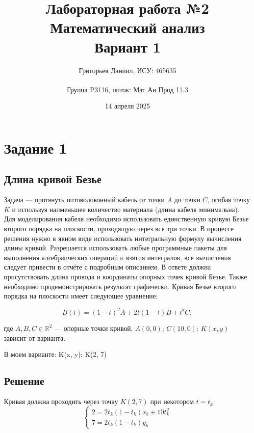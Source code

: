 \documentclass{article}
\title{Лабораторная работа №2\\Математический анализ\\Вариант 1}
\author{Григорьев Даниил, ИСУ: 465635\\\\ Группа P3116, поток: Мат Ан Прод 11.3}
\date{14 апреля 2025}
\begin{document}
\maketitle

\section*{Задание 1}
\subsection*{Длина кривой Безье}
Задача — протянуть оптоволоконный кабель от точки $A$ до точки $C$, огибая точку $K$ и используя наименьшее количество материала (длина кабеля минимальна). Для моделирования кабеля необходимо использовать единственную кривую Безье второго порядка на плоскости, проходящую через все три точки. В процессе решения нужно в явном виде использовать интегральную формулу вычисления длины кривой. Разрешается использовать любые программные пакеты для выполнения алгебраических операций и взятия интегралов, все вычисления следует привести в отчёте с подробным описанием. В ответе должна присутствовать длина провода и координаты опорных точек кривой Безье. Также необходимо продемонстрировать результат графически. Кривая Безье второго порядка на плоскости имеет следующее уравнение:

\[
B(t) = (1 - t)^2 A + 2t(1 - t)B + t^2C,
\]

где $A, B, C \in \mathbb{R}^2$ — опорные точки кривой. $A(0, 0)$; $C(10, 0)$; $K(x, y)$ зависит от варианта.

В моем варианте: K(x, y): K(2, 7)
\subsection*{Решение}
Кривая должна проходить через точку $K(2,7)$ при некотором $t = t_k$:
\[
\begin{cases}
2 = 2t_k(1-t_k)x_b + 10t_k^2 \\
7 = 2t_k(1-t_k)y_b
\end{cases}
\]
\end{document}
